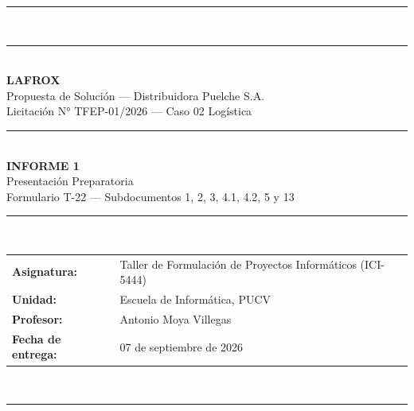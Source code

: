 \documentclass[11pt,a4paper,oneside]{report}
\begin{document}
\begin{titlepage}
  \thispagestyle{empty}
  \noindent
  \begin{minipage}[t][\textheight][t]{\textwidth}
    \centering
    \vspace*{1.2cm}
    {\color{lafroxVioleta}\rule{\textwidth}{2pt}}\\[0.4cm]
    {\color{lafroxVioleta}\rule{\textwidth}{0.6pt}}\\[1.2cm]

    {\Huge\bfseries\color{lafroxVioleta} LAFROX}\\[0.5cm]
    {\Large\color{lafroxAzul} Propuesta de Solución --- Distribuidora Puelche S.A.}\\[0.3cm]
    {\large\color{lafroxGrato} Licitación N° TFEP-01/2026 --- Caso 02 Logística}\\[1.0cm]

    {\color{lafroxVioleta}\rule{\textwidth}{0.6pt}}\\[0.6cm]

    {\LARGE\bfseries\color{lafroxVioleta} INFORME 1}\\[0.3cm]
    {\Large\color{lafroxAzul} Presentación Preparatoria}\\[0.2cm]
    {\normalsize\color{lafroxGrato} Formulario T-22 --- Subdocumentos 1, 2, 3, 4.1, 4.2, 5 y 13}\\[1.5cm]

    {\color{lafroxVioleta}\rule{\textwidth}{0.6pt}}\\[1.2cm]

    {\normalsize\color{lafroxGrato}
    \begin{tabular}{ll}
      \textbf{Asignatura:} & Taller de Formulación de Proyectos Informáticos (ICI-5444) \\
      \textbf{Unidad:} & Escuela de Informática, PUCV \\
      \textbf{Profesor:} & Antonio Moya Villegas \\
      \textbf{Fecha de entrega:} & 07 de septiembre de 2026 \\
    \end{tabular}
    }\\[1.2cm]

    {\color{lafroxVioleta}\rule{\textwidth}{2pt}}
  \end{minipage}
\end{titlepage}

\tableofcontents
\newpage
\end{document}
